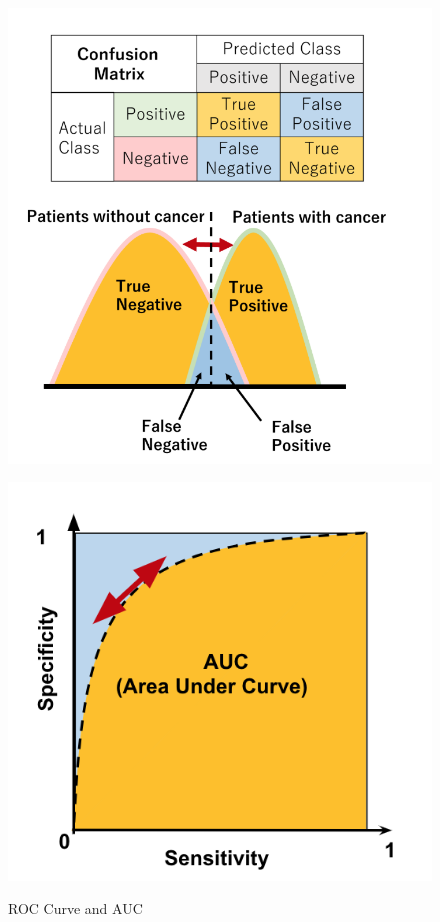 \begin{figure}[H]
	\centering
	\begin{minipage}{0.6\columnwidth}
		\centering
		\includegraphics[clip, width=0.7\linewidth]{fig/chapter2/why_roc}
		\label{fig:why_roc}
	\end{minipage}
	\begin{minipage}{0.8\columnwidth}
		\centering
		\includegraphics[clip, width=0.7\linewidth]{fig/chapter2/roc_curve}
		\label{fig:roc_curve}
	\end{minipage}
	\caption{ROC Curve and AUC}
	\label{fig:roc}
\end{figure}